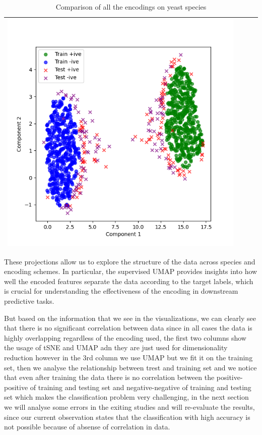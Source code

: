 \begin{table}[htbp]
\begin{tabularx}{\textwidth}{|p{1cm}|X|X|X|}
        \includegraphics[width=\linewidth]{images/encodings/unsupervised/yeast/plot_1_3} \\
        \hline
      \end{tabularx}
      \caption{Comparison of all the encodings on yeast species}\label{tab:dea-unsupervised-encodings-S}
    \end{table}

    These projections allow us to explore the structure of the data across species and encoding schemes.
    In particular, the supervised UMAP provides insights into how well the encoded features separate the data according to the target labels, which is crucial for understanding the effectiveness of the encoding in downstream predictive tasks.

    But based on the information that we see in the visualizations, we can clearly see that there is no significant correlation between data since in all cases the data is highly overlapping regardless of the encoding used, the first two columns show the usage of tSNE and UMAP adn they are just used for dimensionality reduction however in the 3rd column we use UMAP but we fit it on the training set, then we analyse the relationship between trest and training set and we notice that even after training the data there is no correlation between the positive-positive of training and testing set and negative-negative of training and testing set which makes the classification problem very challenging, in the next section we will analyse some errors in the exiting studies and will re-evaluate the results, since our current observation states that the classification with high accuracy is not possible because of absense of correlation in data.


